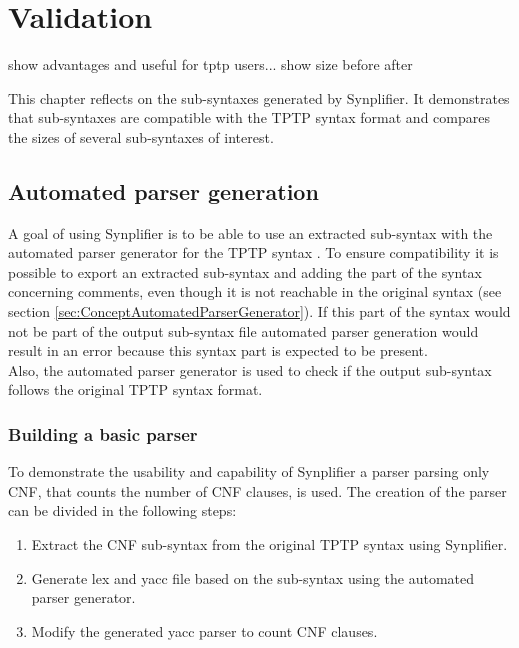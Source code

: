 \chapter{Validation}\label{sec:Validation}

show advantages and useful for tptp users...
show size before after 

This chapter reflects on the sub-syntaxes generated by \ac{Synplifier}. It demonstrates that sub-syntaxes are compatible with the \ac{TPTP} syntax format and compares the sizes of several sub-syntaxes of interest.

%

\section{Automated parser generation}\label{sec:ValidationAutomatedParserGeneration}

A goal of using \ac{Synplifier} is to be able to use an extracted sub-syntax with the automated parser generator for the \ac{TPTP} syntax \cite{VS06}.
To ensure compatibility it is possible to export an extracted sub-syntax and adding the part of the syntax concerning comments, even though it is not reachable in the original syntax (see section \ref{sec:ConceptAutomatedParserGenerator}). If this part of the syntax would not be part of the output sub-syntax file automated parser generation would result in an error because this syntax part is expected to be present.\\
Also, the automated parser generator is used to check if the output sub-syntax follows the original \ac{TPTP} syntax format.

\subsection{Building a basic parser}\label{sec:ValidationAutomatedParserGenerationBuildingBasicParser}

To demonstrate the usability and capability of \ac{Synplifier} a parser parsing only \ac{CNF}, that counts the number of \ac{CNF} clauses, is used.
The creation of the parser can be divided in the following steps:
\begin{enumerate}%
	\item Extract the \ac{CNF} sub-syntax from the original \ac{TPTP} syntax using \ac{Synplifier}.
	\item Generate lex and yacc file based on the sub-syntax using the automated parser generator.
	\item Modify the generated yacc parser to count \ac{CNF} clauses.
\end{enumerate}

